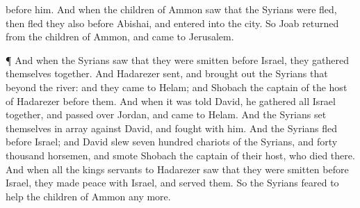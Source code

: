 {before him.
And when the
children of
Ammon
saw that the
Syrians were
fled, then
fled they also
before
Abishai, and
entered into the
city. So
Joab
returned from the
children of
Ammon, and
came to
Jerusalem.
\par }{\PP {}¶ And when the
Syrians
saw that they were
smitten
before
Israel, they
gathered themselves
together.
And
Hadarezer
sent, and brought
out the
Syrians that
{}
beyond the
river: and they
came to
Helam; and
Shobach the
captain of the
host of
Hadarezer
{}
before them.
And when it was
told
David, he
gathered all
Israel
together, and passed
over
Jordan, and
came to
Helam. And the
Syrians set themselves in
array
against
David, and
fought with him.
And the
Syrians
fled
before
Israel; and
David
slew
{}
seven
hundred
chariots of the
Syrians, and
forty
thousand
horsemen, and
smote
Shobach the
captain of their
host, who
died there.
And when all the
kings
{}
servants to
Hadarezer
saw that they were
smitten
before
Israel, they made
peace with
Israel, and
served them. So the
Syrians
feared to
help the
children of
Ammon any more.

}
